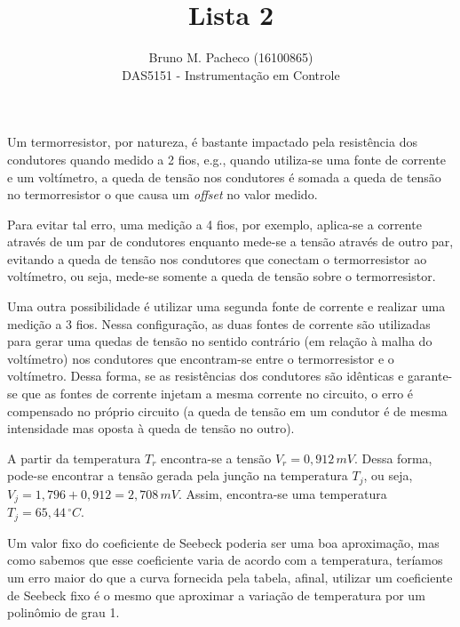 \documentclass[a4paper]{report}
\begin{document}
 
\title{Lista 2}
\author{Bruno M. Pacheco (16100865)\\
DAS5151 - Instrumentação em Controle}
 
\maketitle
 

Um termorresistor, por natureza, é bastante impactado pela resistência dos condutores quando medido a 2 fios, e.g., quando utiliza-se uma fonte de corrente e um voltímetro, a queda de tensão nos condutores é somada a queda de tensão no termorresistor o que causa um \emph{offset} no valor medido.

Para evitar tal erro, uma medição a 4 fios, por exemplo, aplica-se a corrente através de um par de condutores enquanto mede-se a tensão através de outro par, evitando a queda de tensão nos condutores que conectam o termorresistor ao voltímetro, ou seja, mede-se somente a queda de tensão sobre o termorresistor.

Uma outra possibilidade é utilizar uma segunda fonte de corrente e realizar uma medição a 3 fios. Nessa configuração, as duas fontes de corrente são utilizadas para gerar uma quedas de tensão no sentido contrário (em relação à malha do voltímetro) nos condutores que encontram-se entre o termorresistor e o voltímetro. Dessa forma, se as resistências dos condutores são idênticas e garante-se que as fontes de corrente injetam a mesma corrente no circuito, o erro é compensado no próprio circuito (a queda de tensão em um condutor é de mesma intensidade mas oposta à queda de tensão no outro).



A partir da temperatura $T_r$ encontra-se a tensão $V_r = 0,912\,mV$. Dessa forma, pode-se encontrar a tensão gerada pela junção na temperatura $T_j$, ou seja, $V_j = 1,796+0,912 = 2,708\,mV$. Assim, encontra-se uma temperatura $T_j = 65,44\,^\circ C$.


Um valor fixo do coeficiente de Seebeck poderia ser uma boa aproximação, mas como sabemos que esse coeficiente varia de acordo com a temperatura, teríamos um erro maior do que a curva fornecida pela tabela, afinal, utilizar um coeficiente de Seebeck fixo é o mesmo que aproximar a variação de temperatura por um polinômio de grau 1.
\end{document}
